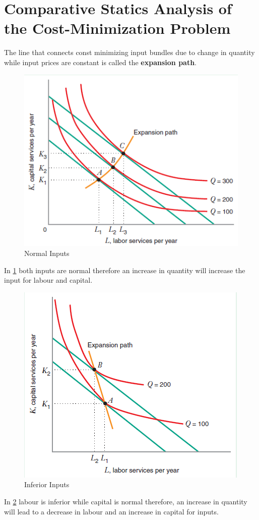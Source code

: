 \documentclass[../ECON-281-Notes.tex]{subfiles}
\begin{document}
\section{Comparative Statics Analysis of the Cost-Minimization Problem}
The line that connects const minimizing input bundles due to change in quantity while input prices are constant is called the \textbf{expansion path}.
\begin{figure}[h]
    \centering
    \includegraphics[width=0.9\columnwidth]{../assets/expansion-path-pos.png}   
    \caption{Normal Inputs}
    \label{fig:normal_inputs}
\end{figure}
In \cref{fig:normal_inputs} both inputs are normal therefore an increase in quantity will increase the input for labour and capital.

\begin{figure}[!h]
    \centering
    \includegraphics[width=0.9\columnwidth]{../assets/expansion-path-neg.png}   
    \caption{Inferior Inputs}
    \label{fig:inferior_inputs}
\end{figure}
In \cref{fig:inferior_inputs} labour is inferior while capital is normal therefore, an increase in quantity will lead to a decrease in labour and an increase in capital for inputs. 
\newpage
\end{document}

